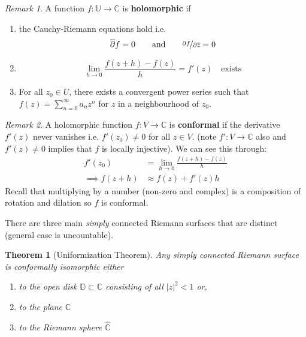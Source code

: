 \documentclass[a4paper, 11pt]{book}
\newtheorem{theorem}{Theorem}
\theoremstyle{definition}
\theoremstyle{remark}
\newtheorem*{remark}{Remark}
\begin{document}
    \begin{remark}
        A function $f:\mathbb{U}\to\mathbb{C}$ is \textbf{holomorphic} if
        \begin{enumerate}
            \item the Cauchy-Riemann equations hold i.e.
                \[ \overline{\partial}{f} = 0\qquad\text{and}\qquad \nicefrac{\partial{f}}{\partial{\overline{z}}} = 0 \]
            \item \[ \lim_{h\to 0} \frac{f(z+h)-f(z)}{h} = f'(z)\quad\text{exists} \]
            \item For all $z_0\in U$, there exists a convergent power series such that $f(z) = \sum_{n=0}^{\infty} a_nz^n$ for
                $z$ in a neighbourhood of $z_0$.
        \end{enumerate}
    \end{remark}

    \begin{remark}
        A holomorphic function $f:V\to\mathbb{C}$ is \textbf{conformal} if the derivative $f'(z)$ never vanishes i.e. $f'(z_0)\neq 0$
        for all $z\in V$. (note $f': V\to\mathbb{C}$ also and $f'(z)\neq 0$ implies that $f$ is locally injective). We can see this
        through:
        \begin{align*}
            f'(z_0) &= \lim_{h\to0} \frac{f(z+h)-f(z)}{h} \\
            \implies f(z+h) &\approx f(z) + f'(z)h
        \end{align*}
        Recall that multiplying by a number (non-zero and complex) is a composition of rotation and dilation so $f$ is conformal.
    \end{remark}

    There are three main \textit{simply} connected Riemann surfaces that are distinct (general case is uncountable).

    \begin{theorem}[Uniformization Theorem]
        Any simply connected Riemann surface is conformally isomorphic either
        \begin{enumerate}
            \item to the open disk $\mathbb{D}\subset\mathbb{C}$ consisting of all $|z|^2 < 1$ or,
            \item to the plane $\mathbb{C}$
            \item to the Riemann sphere $\hat{\mathbb{C}}$
        \end{enumerate}
    \end{theorem}
\end{document}
